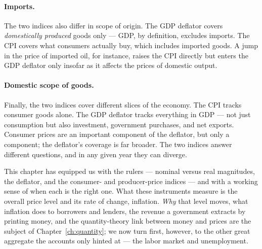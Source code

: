 \paragraph{Imports.} The two indices also differ in scope of origin. The GDP deflator covers \emph{domestically produced} goods only --- GDP, by definition, excludes imports. The CPI covers what consumers actually buy, which includes imported goods. A jump in the price of imported oil, for instance, raises the CPI directly but enters the GDP deflator only insofar as it affects the prices of domestic output.

\paragraph{Domestic scope of goods.} Finally, the two indices cover different slices of the economy. The CPI tracks consumer goods alone. The GDP deflator tracks everything in GDP --- not just consumption but also investment, government purchases, and net exports. Consumer prices are an important component of the deflator, but only a component; the deflator's coverage is far broader. The two indices answer different questions, and in any given year they can diverge.


This chapter has equipped us with the rulers --- nominal versus real magnitudes, the deflator, and the consumer- and producer-price indices --- and with a working sense of when each is the right one. What these instruments measure is the overall price level and its rate of change, inflation. \emph{Why} that level moves, what inflation does to borrowers and lenders, the revenue a government extracts by printing money, and the quantity-theory link between money and prices are the subject of Chapter~\ref{ch:quantity}; we now turn first, however, to the other great aggregate the accounts only hinted at --- the labor market and unemployment.
